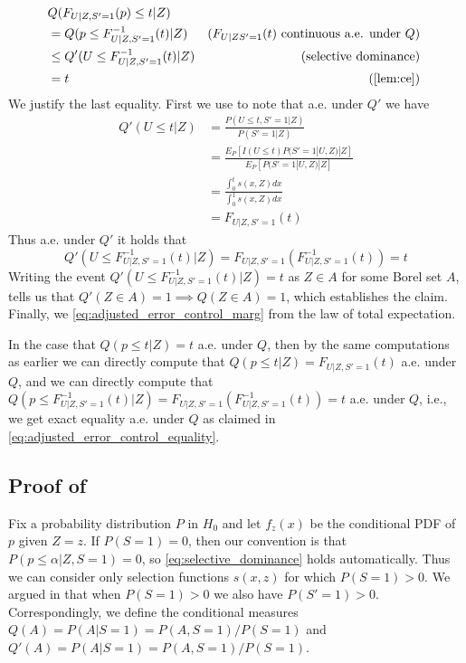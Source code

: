 \documentclass{article}
\begin{document}
\begin{appendix}
\begin{align*}
    &Q(F_{U | Z, S' = 1}(p) \leq t | Z)\\
     &= Q(p \leq F_{U | Z, S' = 1}^{-1}(t) | Z) & \text{($F_{U|Z S'=1}(t)$ continuous a.e. under $Q$) } \\
    &\leq Q'(U \leq F_{U |Z, S' = 1}^{-1}(t) |Z) & \text{(selective dominance) } \\
    &= t & \text{ (\Cref{lem:ce}) }
\end{align*}
We justify the last equality. First we use  to note that a.e. under $Q'$ we have 
\begin{align*}
    Q'(U \leq t |Z) &= \frac{P(U \leq t, S' = 1 | Z )}{P( S' = 1 | Z)}\\
                    &= \frac{E_P[I(U \leq t)P(S' = 1 | U, Z ) | Z ] }{E_P[P(S' = 1 | U, Z)| Z]}\\
                    &= \frac{\int_0^t s(x, Z) dx }{\int_0^1 s(x, Z) dx}\\
                    &= F_{U| Z, S'=1}(t)
\end{align*}
Thus a.e. under $Q'$ it holds that
\begin{equation*}
    Q'(U \leq F_{U |Z, S' = 1}^{-1}(t) |Z) = F_{U| Z, S'=1}(F^{-1}_{U| Z, S'=1}(t)) = t
\end{equation*}
Writing the event $Q'(U \leq F_{U |Z, S' = 1}^{-1}(t) |Z) = t$ as $Z \in A$ for some Borel set $A$,  tells us that $Q'(Z \in A) = 1 \implies Q(Z \in A) = 1$, which establishes the claim. Finally, we \eqref{eq:adjusted_error_control_marg} from the law of total expectation.  

In the case that $Q(p \leq t | Z) = t$ a.e. under $Q$, then by the same computations as earlier we can directly compute that $Q(p \leq t | Z) = F_{U| Z, S'=1}(t)$ a.e. under $Q$, and we can directly compute that $Q(p \leq F^{-1}_{U | Z, S' = 1}(t) | Z) =  F_{U| Z, S'=1}(F^{-1}_{U | Z, S' = 1}(t)) = t $ a.e. under $Q$, i.e., we get exact equality a.e. under $Q$ as claimed in \eqref{eq:adjusted_error_control_equality}. 

 
\subsection{Proof of }
\label{sec:density_proof}

Fix a probability distribution $P$ in $H_0$ and let $f_z(x)$ be the conditional PDF of $p$ given $Z=z$. If $P(S=1) = 0$, then our convention is that $P(p \leq \alpha | Z, S=1) = 0$, so \eqref{eq:selective_dominance} holds automatically. Thus we can consider only selection functions $s(x, z)$ for which $P(S=1) > 0$. We argued in  that when $P(S=1) > 0$ we also have $P(S' = 1)> 0$. Correspondingly, we define the conditional measures $Q(A)= P(A | S=1) = P(A, S=1)/P(S=1)$ and $Q'(A)= P(A | S=1) = P(A, S=1)/P(S=1)$. 


\end{appendix}
\end{document}

